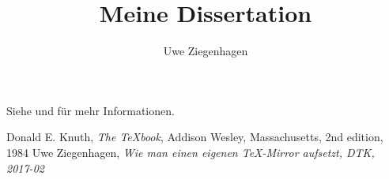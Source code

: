 \documentclass[ngerman,12pt]{scrartcl}
\author{Uwe Ziegenhagen}
\title{Meine Dissertation}
\begin{document}
\maketitle

\tableofcontents

Siehe \cite{knuth} und \cite{uwe} für mehr Informationen.



\blindtext

\begin{thebibliography}{9}
 Donald E. Knuth, \textit{The \TeX book}, Addison Wesley, Massachusetts, 2nd edition, 1984
 Uwe Ziegenhagen, \textit{Wie man einen eigenen \TeX-Mirror aufsetzt, DTK, 2017-02}
\end{thebibliography}
\end{document}
